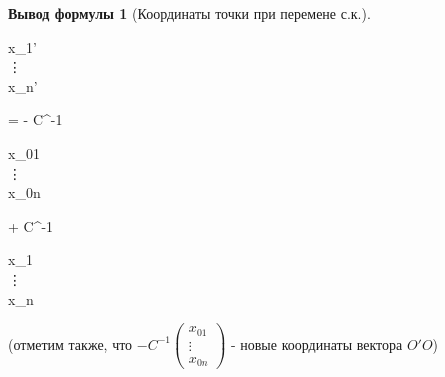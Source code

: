 \documentclass[a4paper, 12pt]{article}
\theoremstyle{definition}
\newtheorem*{formula}{Вывод формулы}
\newenvironment{boxedalign*}
  {\begin{equation*}\begin{lrbox}{\boxedalignbox}$\begin{aligned}}
  {\end{aligned}$\end{lrbox}\fbox{\usebox{\boxedalignbox}}\end{equation*}}
\begin{document}
\begin{formula}[Координаты точки при перемене с.к.]
		\begin{boxedalign*}\begin{pmatrix} x_{1}' \\ \vdots \\ x_{n}' \end{pmatrix} = - C^{-1}\begin{pmatrix} x_{01} \\ \vdots \\ x_{0n} \end{pmatrix} + C^{-1}\begin{pmatrix} x_{1} \\ \vdots \\ x_{n} \end{pmatrix} \end{boxedalign*}
		(отметим также, что $- C^{-1}\begin{pmatrix} x_{01} \\ \vdots \\ x_{0n} \end{pmatrix}$ - новые координаты вектора $O'O$)
	\end{formula}
\end{document}
